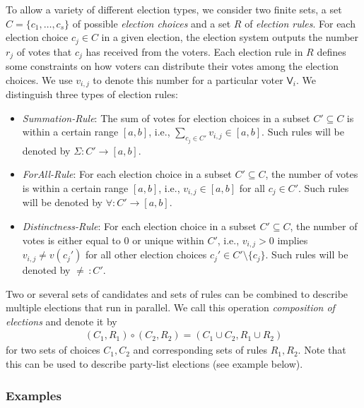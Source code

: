 \documentclass[bibtotoc,halfparskip,oneside]{scrreprt}
\newcommand{\Voter}[1]{\ensuremath{\mathsf{V}_{#1}}\xspace}
\begin{document}
To allow a variety of different election types, we consider two finite sets, a set $C=\{c_1,\ldots,c_s\}$ of possible \emph{election choices} and a set $R$ of \emph{election rules}. For each election choice $c_j\in C$ in a given election, the election system outputs the number $r_j$ of votes that $c_j$ has received from the voters. Each election rule in $R$ defines some constraints on how voters can distribute their votes among the election choices. We use $v_{i,j}$ to denote this number for a particular voter $\Voter{i}$. We distinguish three types of election rules:
\begin{itemize}
	\item \emph{Summation-Rule}: The sum of votes for election choices in a subset $C'\subseteq C$ is within a certain range $[a,b]$, i.e., $\sum\limits_{c_j\in C'}v_{i,j}\in [a,b]$. Such rules will be denoted by $\Sigma:C'\rightarrow[a,b]$.
	\item \emph{ForAll-Rule}: For each election choice in a subset $C'\subseteq C$, the number of votes is within a certain range $[a,b]$, i.e., $v_{i,j}\in [a,b]$ for all $c_j\in C'$. Such rules will be denoted by $\forall:C'\rightarrow[a,b]$. 
	\item \emph{Distinctness-Rule}: For each election choice in a subset $C'\subseteq C$, the number of votes is either equal to $0$ or unique within $C'$, i.e., $v_{i,j}>0$ implies $v_{i,j}\not= v(c_j')$ for all other election choices $c_j'\in C'\setminus\{c_j\}$. Such rules will be denoted by $\not=\,:C'$.
\end{itemize}
Two or several sets of candidates and sets of rules can be combined to describe multiple elections that run in parallel. We call this operation \emph{composition of elections} and denote it by
\begin{align*}
	(C_1,R_1) \circ (C_2,R_2) = (C_1\cup C_2, R_1 \cup R_2)
\end{align*}
for two sets of choices $C_1,C_2$ and corresponding sets of rules $R_1,R_2$. Note that this can be used to describe party-list elections (see example below).

\subsubsection{Examples}
\end{document}
